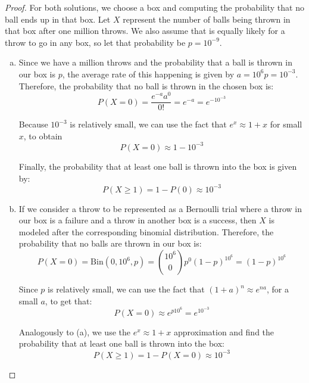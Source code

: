\vspace{1em}

\begin{proof}
    For both solutions, we choose a box and computing the probability that
    no ball ends up in that box. Let $X$ represent the number of balls
    being thrown in that box after one million throws. We also assume that 
    is equally likely for a throw to go in any box, so let that probability
    be $p = 10^{-9}$.

    \begin{enumerate}[(a)]
        \item Since we have a million throws and the probability that 
            a ball is thrown in our box is $p$, the average rate
            of this happening is given by $a = 10^6 p= 10^{-3}$.
            Therefore, the probability that no ball is thrown
            in the chosen box is:
            \[
                P(X = 0) = \frac{e^{-a}a^0}{0!} = e^{-a} = e^{-10^{-3}}
            \] 
            
            Because $10^{-3}$ is relatively small, we can use the fact that
            $e^x \approx 1 + x$ for small $x$, to obtain
            \[
                P(X = 0) \approx 1 - 10^{-3}
            \] 

            Finally, the probability that at least one ball is thrown
            into the box is given by:
            \[
                P(X \geq 1) = 1 - P(0) \approx 10^{-3}
            \] 

        \item If we consider a throw to be represented as a Bernoulli trial where
            a throw in our box is a failure and a throw in another box is a
            success, then $X$ is modeled after the corresponding binomial distribution.
            Therefore, the probability that no balls are thrown in our box is:
            \[
                P(X = 0) = \text{Bin}(0, 10^6, p) = \binom{10^6}{0} p^0 (1 - p)^{10^6}
                = (1 - p)^{10^6}
            \] 

            Since $p$ is relatively small, we can use the fact that $(1 + a)^n \approx e^{na}$, for
            a small $a$, to get that:
            \[
                P(X = 0) \approx e^{p10^6} = e^{10^{-3}}
            \] 

            Analogously to (a), we use the $e^x \approx 1 + x$ approximation and find
            the probability that at least one ball is thrown into the box:
            \[
                P(X \geq 1) = 1 - P(X = 0) \approx 10^{-3}
            \] 
    \end{enumerate}
\end{proof}

